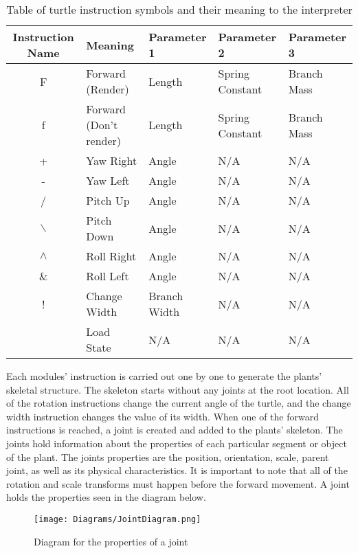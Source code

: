 \begin{table}[h!]
\centering
\begin{tabular}{ | c | l | l | l | l |}
\hline
	Instruction Name  & Meaning					& Parameter 1 	& Parameter 2 		& Parameter 3 \\  
\hline
\hline
	F 				&	Forward (Render)		& Length		& Spring Constant	& Branch Mass\\
\hline
	f 				&	Forward (Don't render)	& Length 		& Spring Constant	& Branch Mass\\
\hline
	+ 				&	Yaw	Right				& Angle 		&	N/A				&N/A\\
\hline
	- 				&	Yaw Left				& Angle			&	N/A				&N/A\\
\hline
	/ 				&	Pitch Up				& Angle			&	N/A				&N/A\\
\hline
	$\backslash$ 	&	Pitch Down				& Angle			&	N/A				&N/A\\
\hline
	$\land$ 		&	Roll Right				& Angle			&	N/A				&N/A\\
\hline
	\& 				&	Roll Left				& Angle 		&	N/A				&N/A\\
\hline
	! 				&	Change Width			& Branch Width	&	N/A				&N/A\\
\hline
	[ 				&	Save State				& N/A			&	N/A				&N/A\\
\hline
	] 				&	Load State				& N/A 			&	N/A				&N/A\\
\hline
\end{tabular}
\caption{Table of turtle instruction symbols and their meaning to the interpreter}
\label{instruction table 1}
\end{table}
\FloatBarrier

\noindent
Each modules' instruction is carried out one by one to generate the plants' skeletal structure. The skeleton starts without any joints at the root location. All of the rotation instructions change the current angle of the turtle, and the change width instruction changes the value of its width. When one of the forward instructions is reached, a joint is created and added to the plants' skeleton. The joints hold information about the properties of each particular segment or object of the plant. The joints properties are the position, orientation, scale, parent joint, as well as its physical characteristics. It is important to note that all of the rotation and scale transforms must happen before the forward movement. A joint holds the properties seen in the diagram below.

\begin{figure}[htbp]
	{\centering
		\vspace{7px}
		\texttt{[image: Diagrams/JointDiagram.png]}
		\caption{Diagram for the properties of a joint} \label{joint properties}
	}
\end{figure}
\FloatBarrier

